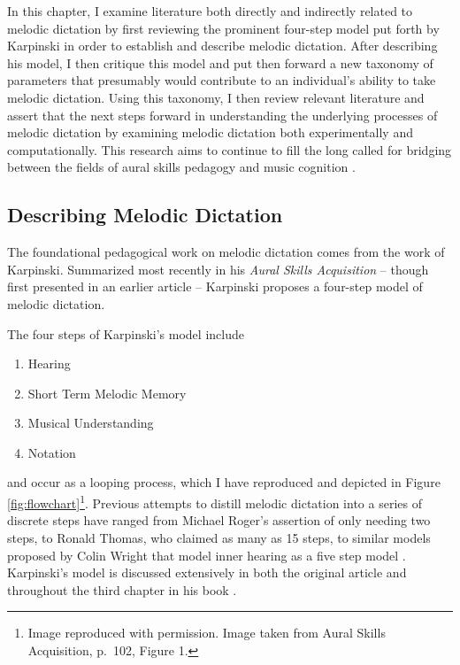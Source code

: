 \documentclass[12pt,]{book}
\providecommand{\tightlist}{%
  \setlength{\itemsep}{0pt}\setlength{\parskip}{0pt}}
\let\rmarkdownfootnote\footnote%
\def\footnote{\protect\rmarkdownfootnote}
\begin{document}
In this chapter, I examine literature both directly and indirectly related to melodic dictation by first reviewing the prominent four-step model put forth by Karpinski in order to establish and describe melodic dictation.
After describing his model, I then critique this model and put then forward a new taxonomy of parameters that presumably would contribute to an individual's ability to take melodic dictation.
Using this taxonomy, I then review relevant literature and assert that the next steps forward in understanding the underlying processes of melodic dictation by examining melodic dictation both experimentally and computationally.
This research aims to continue to fill the long called for bridging between the fields of aural skills pedagogy and music cognition \citep{davidbutlerWhyGulfMusic1997a, karpinskiAuralSkillsAcquisition2000, klonoskiPerceptualLearningHierarchy2000}.

\hypertarget{describing-melodic-dictation}{%
\subsection{Describing Melodic Dictation}\label{describing-melodic-dictation}}

The foundational pedagogical work on melodic dictation comes from the work of Karpinski.
Summarized most recently in his \emph{Aural Skills Acquisition} \citep{karpinskiAuralSkillsAcquisition2000}-- though first presented in an earlier article \citep{karpinskiModelMusicPerception1990}-- Karpinski proposes a four-step model of melodic dictation.

The four steps of Karpinski's model include

\begin{enumerate}
\def\labelenumi{\arabic{enumi}.}
\tightlist
\item
  Hearing
\item
  Short Term Melodic Memory
\item
  Musical Understanding
\item
  Notation
\end{enumerate}

and occur as a looping process, which I have reproduced and depicted in Figure \ref{fig:flowchart}\footnote{Image reproduced with permission. Image taken from Aural Skills Acquisition, p.~102, Figure 1.}.
Previous attempts to distill melodic dictation into a series of discrete steps have ranged from Michael Roger's assertion of only needing two steps, to Ronald Thomas, who claimed as many as 15 steps, to similar models proposed by Colin Wright that model inner hearing as a five step model \citep{wrightInvestigatingAuralCase2016, karpinskiAuralSkillsAcquisition2000}.
Karpinski's model is discussed extensively in both the original article \citep{karpinskiModelMusicPerception1990} and throughout the third chapter in his book \citep{karpinskiAuralSkillsAcquisition2000}.
\end{document}

